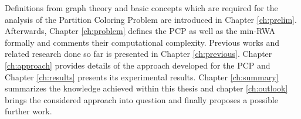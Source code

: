 Definitions from graph theory and basic concepts which are required for the analysis of the Partition Coloring Problem are introduced in Chapter \ref{ch:prelim}. Afterwards, Chapter \ref{ch:problem} defines the PCP as well as the min-RWA formally and comments their computational complexity. Previous works and related research done so far is presented in Chapter \ref{ch:previous}. Chapter \ref{ch:approach} provides details of the approach developed for the PCP and Chapter \ref{ch:results} presents its experimental results. Chapter \ref{ch:summary} summarizes the knowledge achieved within this thesis and chapter \ref{ch:outlook} brings the considered approach into question and finally proposes a possible further work.